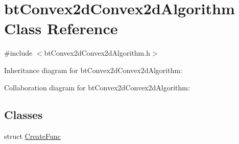 \hypertarget{classbt_convex2d_convex2d_algorithm}{\section{bt\+Convex2d\+Convex2d\+Algorithm Class Reference}
\label{classbt_convex2d_convex2d_algorithm}
}


{\ttfamily \#include $<$bt\+Convex2d\+Convex2d\+Algorithm.\+h$>$}



Inheritance diagram for bt\+Convex2d\+Convex2d\+Algorithm\+:


Collaboration diagram for bt\+Convex2d\+Convex2d\+Algorithm\+:
\subsection*{Classes}
\begin{DoxyCompactItemize}
\item 
struct \hyperlink{structbt_convex2d_convex2d_algorithm_1_1_create_func}{Create\+Func}
\end{DoxyCompactItemize}
